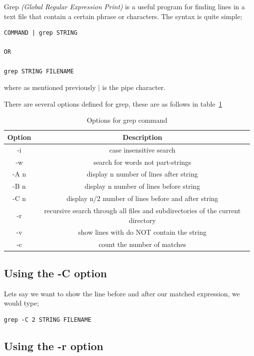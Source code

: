 Grep \textit{(Global Regular Expression Print)} is a useful program for finding lines in a text file that contain a certain phrase or characters.  The syntax is quite simple;

\begin{lstlisting}
COMMAND | grep STRING

OR

grep STRING FILENAME
\end{lstlisting}

where as mentioned previously $|$ is the pipe character.

There are several options defined for grep, these are as follows in table~\ref{tab:grep}

\begin{table}[!th]
\centering
\begin{tabular}{cc}
\hline
Option & Description\\
\hline
-i & case insensitive search\\
-w & search for words not part-strings\\
-A n & display n number of lines after string\\
-B n & display n number of lines before string\\
-C n & display n/2 number of lines before and after string\\
-r & recursive search through all files and subdirectories of the current directory\\
-v & show lines with do NOT contain the string\\
-c & count the number of matches\\
\hline
\end{tabular}
\caption{Options for grep command}
\label{tab:grep}
\end{table}

\subsection{Using the -C option}

Lets say we want to show the line before and after our matched expression, we would type;

\begin{lstlisting}
grep -C 2 STRING FILENAME
\end{lstlisting}

\subsection{Using the -r option}

